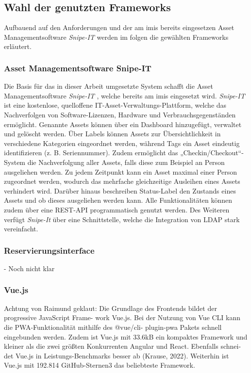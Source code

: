 \subsection{Wahl der genutzten Frameworks}
Aufbauend auf den Anforderungen und der am \ac{imis} bereits eingesetzen Asset
Managementsoftware \textit{Snipe-IT} werden im folgen die gewählten Frameworks
erläutert.

\subsubsection{Asset Managementsoftware Snipe-IT}

Die Basis für das in dieser Arbeit umgesetzte System schafft die Asset
Managementsoftware \textit{Snipe-IT} \cite{noauthor_home_nodate}, welche bereits
am \ac{imis} eingesetzt wird. \textit{Snipe-IT} ist eine kostenlose, quelloffene
IT-Asset-Verwaltungs-Plattform, welche das Nachverfolgen von Software-Lizenzen,
Hardware und Verbrauchsgegenständen ermöglicht. Genannte Assets können über ein
Dashboard hinzugefügt, verwaltet und gelöscht werden. Über Labels können Assets
zur Übersichtlichkeit in verschiedene Kategorien eingeordnet werden, während
Tags ein Asset eindeutig identifizieren (z. B. Seriennummer). Zudem ermöglicht
das „Checkin/Checkout“-System die Nachverfolgung aller Assets, falls diese zum
Beispiel an Person ausgeliehen werden. Zu jedem Zeitpunkt kann ein Asset maximal
einer Person zugeordnet werden, wodurch das mehrfache gleichzeitige Ausleihen
eines Assets verhindert wird. Darüber hinaus beschreiben Status-Label den
Zustands eines Assets und ob dieses ausgeliehen werden kann. Alle
Funktionalitäten können zudem über eine REST-API programmatisch genutzt werden.
Des Weiteren verfügt \textit{Snipe-It} über eine Schnittstelle, welche die
Integration von LDAP stark vereinfacht.

\subsubsection{Reservierungsinterface}
- Noch nicht klar

\subsubsection{Vue.js}
Achtung von Raimund geklaut: Die Grundlage des Frontends bildet der progressive
JavaScript Frame- work Vue.js. Bei der Nutzung von Vue CLI kann die
PWA-Funktionalität mithilfe des @vue/cli- plugin-pwa Pakets schnell eingebunden
werden. Zudem ist Vue.js mit 33.6kB ein kompaktes Framework und kleiner als die
zwei größten Konkurrenten Angular und React. Ebenfalls schnei- det Vue.js in
Leistungs-Benchmarks besser ab (Krause, 2022). Weiterhin ist Vue.js mit 192.814
GitHub-Sternen3 das beliebteste Framework.

